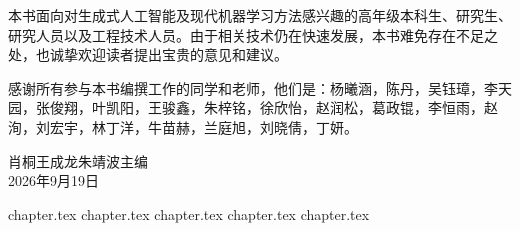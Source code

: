 \documentclass[UTF8,a4paper,zihao=-4,oneside,openany]{ctexbook}
\newcommand{\editors}{肖桐\quad 王成龙\quad 朱靖波}
\newcommand{\lessondate}{2026年9月19日}
\begin{document}
本书面向对生成式人工智能及现代机器学习方法感兴趣的高年级本科生、研究生、研究人员以及工程技术人员。由于相关技术仍在快速发展，本书难免存在不足之处，也诚挚欢迎读者提出宝贵的意见和建议。

感谢所有参与本书编撰工作的同学和老师，他们是：杨曦涵，陈丹，吴钰璋，李天园，张俊翔，叶凯阳，王骏鑫，朱梓铭，徐欣怡，赵润松，葛政锟，李恒雨，赵洵，刘宏宇，林丁洋，牛苗赫，兰庭旭，刘晓倩，丁妍。

\vspace{1em}
\begin{flushright}
\editors\quad 主编 \\
\lessondate 
\end{flushright}
\cleardoublepage

\tableofcontents
\cleardoublepage

\mainmatter
\pagestyle{fancy}

{chapter.tex}
{chapter.tex}
{chapter.tex}
{chapter.tex}
{chapter.tex}

\backmatter

\end{document}
